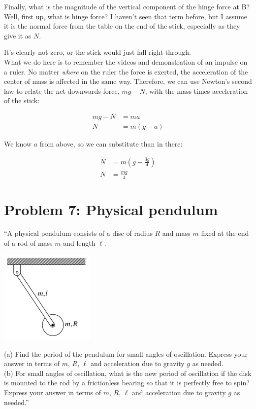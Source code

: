 \documentclass[12pt,a4paper]{report}
\begin{document}
Finally, what is the magnitude of the vertical component of the hinge force at B?\\
Well, first up, what is hinge force? I haven't seen that term before, but I assume it is the normal force from the table on the end of the stick, especially as they give it as $N$.

It's clearly not zero, or the stick would just fall right through.\\
What we do here is to remember the videos and demonstration of an impulse on a ruler. No matter \emph{where} on the ruler the force is exerted, the acceleration of the center of mass is affected in the same way. Therefore, we can use Newton's second law to relate the net downwards force, $m g - N$, with the mass times acceleration of the stick:

\begin{align}
m g - N &= m a\\
N &= m(g - a)
\end{align}

We know $a$ from above, so we can substitute than in there:

\begin{align}
N &= m(g - \frac{3g}{4})\\
N &= \frac{m g}{4}
\end{align}

\section{Problem 7: Physical pendulum}

``A physical pendulum consists of a disc of radius $R$ and mass $m$ fixed at the end of a rod of mass $m$ and length $\ell$.

\begin{center}
\includegraphics[scale=0.8]{Graphics/h7p7}
\end{center}

(a) Find the period of the pendulum for small angles of oscillation. Express your answer in terms of $m$, $R$, $\ell$ and acceleration due to gravity $g$ as needed.\\
(b) For small angles of oscillation, what is the new period of oscillation if the disk is mounted to the rod by a frictionless bearing so that it is perfectly free to spin? Express your answer in terms of $m$, $R$, $\ell$ and acceleration due to gravity $g$ as needed.''
\end{document}
